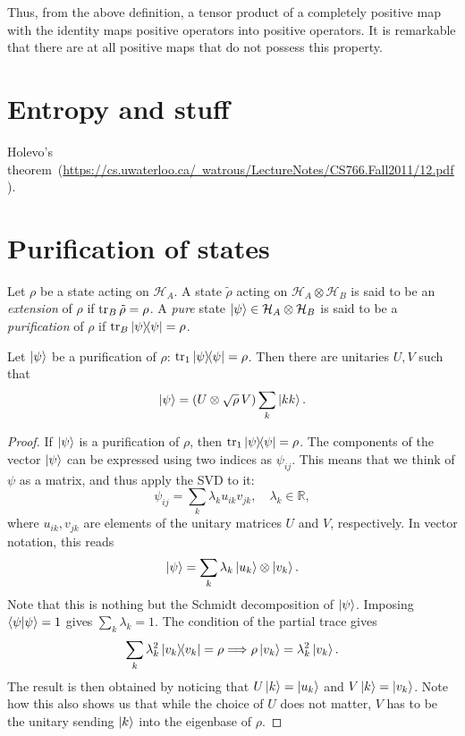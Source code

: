 \documentclass[12pt]{report}
\newcommand{\RR}{\mathbb{R}}
\newcommand{\calH}{{\mathcal{H}}}
\begin{document}
Thus, from the above definition, a tensor product of a completely positive map with the identity maps positive operators into positive operators.
It is remarkable that there are at all positive maps that do not possess this 
property.

\section{Entropy and stuff}
Holevo's theorem~(\href{Watrous notes, chapter 12}{https://cs.uwaterloo.ca/~watrous/LectureNotes/CS766.Fall2011/12.pdf}).

\section{Purification of states}

\begin{defn}
	Let $\rho$ be a state acting on $\calH_A$.
	A state $\tilde\rho$ acting on $\calH_A\otimes\calH_B$ is said to be an \emph{extension} of $\rho$ if $\tr_B\tilde\rho=\rho$.
	A \emph{pure} state $\ket\psi\in\calH_A\otimes\calH_B$ is said to be a \emph{purification} of $\rho$ if $\tr_B\ketbra\psi=\rho$.
\end{defn}

\begin{prop}
	Let $\ket\psi$ be a purification of $\rho$: $\tr_1\ketbra\psi=\rho$. Then there are unitaries $U, V$ such that
	\begin{equation}
		\ket\psi=(U\otimes \sqrt\rho\,V)\sum_k \ket{kk}.
	\end{equation}
\end{prop}
\begin{proof}
	If $\ket\psi$ is a purification of $\rho$, then $\tr_1\ketbra\psi=\rho$.
	The components of the vector $\ket\psi$ can be expressed using two indices as $\psi_{ij}$. This means that we think of $\psi$ as a matrix, and thus apply the \ac{SVD} to it:
	\begin{equation}
		\psi_{ij} = \sum_k \lambda_k u_{ik} v_{jk},\quad
		\lambda_k\in\RR,
	\end{equation}
	where $u_{ik}, v_{jk}$ are elements of the unitary matrices $U$ and $V$, respectively. In vector notation, this reads
	\begin{equation}
		\ket\psi=\sum_k\lambda_k\ket{u_k}\otimes\ket{v_k}.
	\end{equation}
	Note that this is nothing but the Schmidt decomposition of $\ket\psi$.
	Imposing $\braket\psi=1$ gives $\sum_k \lambda_k=1$.
	The condition of the partial trace gives
	\begin{equation}
		\sum_k \lambda_k^2 \ketbra{v_k}=\rho
		\Longrightarrow \rho\ket{v_k}=\lambda_k^2\ket{v_k}.
	\end{equation}
	The result is then obtained by noticing that $U\ket k=\ket{u_k}$ and $V\ket k=\ket{v_k}$. Note how this also shows us that while the choice of $U$ does not matter, $V$ has to be the unitary sending $\ket k$ into the eigenbase of $\rho$.
\end{proof}
\end{document}
